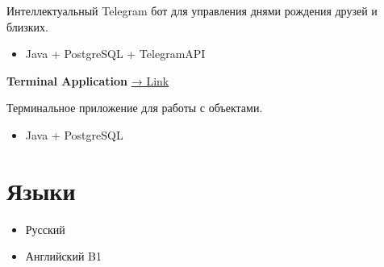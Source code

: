 \documentclass[11pt,a4paper]{article}
\begin{document}
Интеллектуальный Telegram бот для управления днями рождения друзей и близких.
\begin{itemize}[label=$\bullet$]
    \item Java + PostgreSQL + TelegramAPI
\end{itemize}

\vspace{0.6em}

\textbf{Terminal Application} \hfill \href{https://github.com/N0fckgway/University_ITMO/tree/main/Proga}{→ Link}

Терминальное приложение для работы с объектами.
\begin{itemize}[label=$\bullet$]
    \item Java + PostgreSQL
\end{itemize}

\section{Языки}
\begin{itemize}[label=+]
    \item Русский
    \item Английский B1
\end{itemize}
\end{document}
